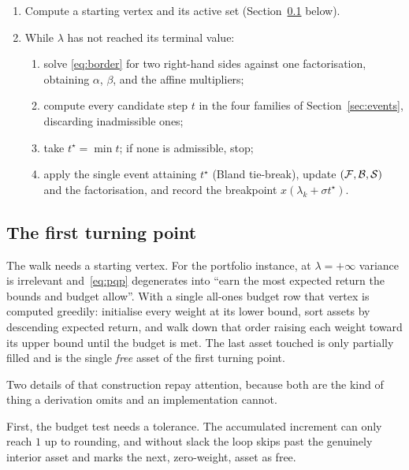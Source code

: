 \begin{algorithmbox}
\label{alg:homotopy}
\begin{enumerate}
\item Compute a starting vertex and its active set (Section~\ref{sec:first} below).
\item While $\lambda$ has not reached its terminal value:
  \begin{enumerate}
  \item solve \eqref{eq:border} for two right-hand sides against one factorisation,
        obtaining $\alpha$, $\beta$, and the affine multipliers;
  \item compute every candidate step $t$ in the four families of
        Section~\ref{sec:events}, discarding inadmissible ones;
  \item take $t^\star = \min t$; if none is admissible, stop;
  \item apply the single event attaining $t^\star$ (Bland tie-break), update
        $(\mathcal{F},\mathcal{B},\mathcal{S})$ and the factorisation, and record the
        breakpoint $x(\lambda_k + \sigma t^\star)$.
  \end{enumerate}
\end{enumerate}
\end{algorithmbox}

\subsection{The first turning point}
\label{sec:first}

The walk needs a starting vertex. For the portfolio instance, at $\lambda = +\infty$
variance is irrelevant and~\eqref{eq:pqp} degenerates into ``earn the most expected
return the bounds and budget allow''. With a single all-ones budget row that vertex
is computed greedily: initialise every weight at its lower bound, sort assets by
descending expected return, and walk down that order raising each weight toward its
upper bound until the budget is met. The last asset touched is only partially filled
and is the single \emph{free} asset of the first turning point.

Two details of that construction repay attention, because both are the kind of thing
a derivation omits and an implementation cannot.

First, the budget test needs a tolerance. The accumulated increment can only reach
$1$ up to rounding, and without slack the loop skips past the genuinely interior
asset and marks the next, zero-weight, asset as free.

